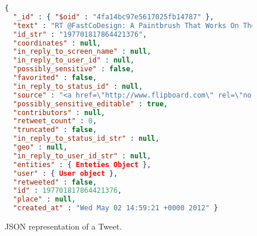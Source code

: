 \begin{figure}[htpb]
  \begin{center}
    \begin{lstlisting}[language=json,firstnumber=1]
{ 
  "_id" : { "$oid" : "4fa14bc97e5617025fb14787" },
  "text" : "RT @FastCoDesign: A Paintbrush That Works On The iPad http://t.co/eWjEZAga (@sensubrushman)",
  "id_str" : "197701817864421376", 
  "coordinates" : null, 
  "in_reply_to_screen_name" : null, 
  "in_reply_to_user_id" : null,
  "possibly_sensitive" : false, 
  "favorited" : false, 
  "in_reply_to_status_id" : null, 
  "source" : "<a href=\"http://www.flipboard.com\" rel=\"nofollow\">Flipboard</a>", 
  "possibly_sensitive_editable" : true, 
  "contributors" : null, 
  "retweet_count" : 0, 
  "truncated" : false,
  "in_reply_to_status_id_str" : null,
  "geo" : null,
  "in_reply_to_user_id_str" : null,
  "entities" : { Enteties Object },
  "user" : { User object },
  "retweeted" : false,
  "id" : 197701817864421376,
  "place" : null,
  "created_at" : "Wed May 02 14:59:21 +0000 2012" }

    \end{lstlisting}
  \end{center}
  \caption{\ac{JSON} representation of a Tweet.}
  \label{fig:json_tweet}
\end{figure}


